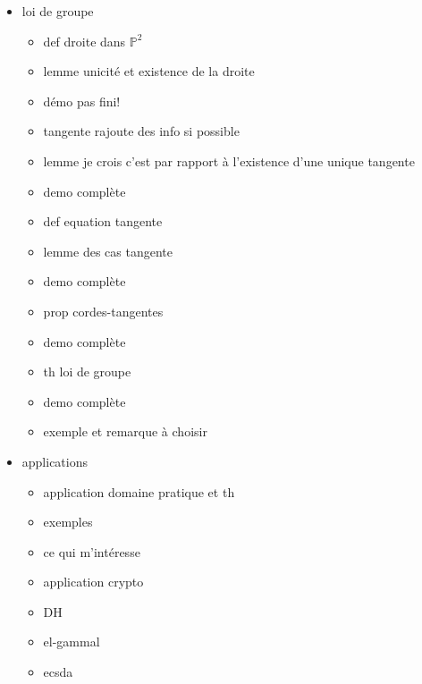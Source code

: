 \begin{itemize}
\begin{itemize}
        \end{itemize}
    \item loi de groupe
        \begin{itemize}
            \item def droite dans $\mathbb{P}^2$
            \item lemme unicité et existence de la droite
            \item démo pas fini!
            \item tangente rajoute des info si possible
            \item lemme je crois c'est par rapport à l'existence d'une unique tangente
            \item demo complète
            \item def equation tangente
            \item lemme des cas tangente
            \item demo complète
            \item prop cordes-tangentes
            \item demo complète
            \item th loi de groupe
            \item demo complète
            \item exemple et remarque à choisir
        \end{itemize}
    \item applications
        \begin{itemize}
            \item application domaine pratique et th
            \item exemples
            \item ce qui m'intéresse
            \item application crypto
            \item DH
            \item el-gammal
            \item ecsda
        \end{itemize}
\end{itemize}





